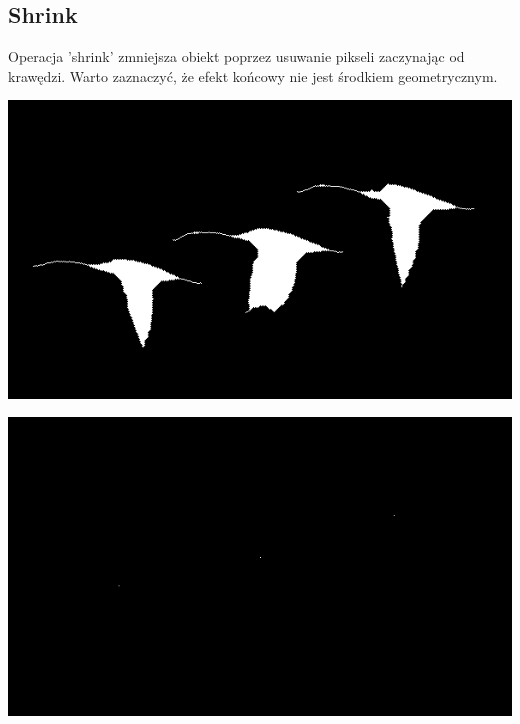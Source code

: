 \documentclass{article}
\begin{document}
	\subsection{Shrink}
	Operacja 'shrink' zmniejsza obiekt poprzez usuwanie pikseli zaczynając od krawędzi. Warto zaznaczyć, że efekt końcowy nie jest środkiem geometrycznym.
	\begin{center}
		\includegraphics[width=\linewidth]{../../lab05/kaczki_shrink_5.png}
	\end{center}
	\begin{center}
		\includegraphics[width=\linewidth]{../../lab05/kaczki_shrink_Inf.png}
	\end{center}
	
\end{document}
